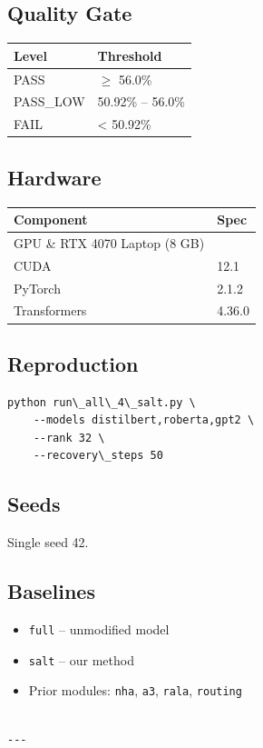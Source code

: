 \subsection{Quality Gate}

\begin{table}[H]
\centering
\small
\begin{tabular}{ll}
\toprule
\textbf{Level} & \textbf{Threshold} \\
\midrule
PASS & $\ge$ 56.0\% \\
PASS\_LOW & 50.92\% -- 56.0\% \\
FAIL & \textless{} 50.92\% \\
\bottomrule
\end{tabular}
\end{table}

\subsection{Hardware}

\begin{table}[H]
\centering
\small
\begin{tabular}{ll}
\toprule
\textbf{Component} & \textbf{Spec} \\
\midrule
GPU \& RTX 4070 Laptop (8 GB) \\
CUDA & 12.1 \\
PyTorch & 2.1.2 \\
Transformers & 4.36.0 \\
\bottomrule
\end{tabular}
\end{table}

\subsection{Reproduction}

\begin{lstlisting}
python run\_all\_4\_salt.py \
    --models distilbert,roberta,gpt2 \
    --rank 32 \
    --recovery\_steps 50
\end{lstlisting}

\subsection{Seeds}

Single seed 42.

\subsection{Baselines}

\begin{itemize}
\item \texttt{full} -- unmodified model
\item \texttt{salt} -- our method
\item Prior modules: \texttt{nha}, \texttt{a3}, \texttt{rala}, \texttt{routing}
\end{itemize}
\begin{lstlisting}

---
\end{lstlisting}